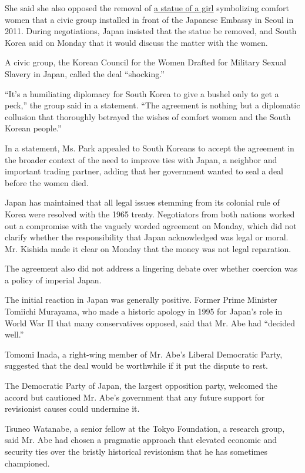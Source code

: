 She said she also opposed the removal of
\href{http://www.nytimes3xbfgragh.onion/2011/12/16/world/asia/statute-in-seoul-becomes-focal-point-of-dispute-between-south-korea-and-japan.html}{a
statue of a girl} symbolizing comfort women that a civic group installed
in front of the Japanese Embassy in Seoul in 2011. During negotiations,
Japan insisted that the statue be removed, and South Korea said on
Monday that it would discuss the matter with the women.

A civic group, the Korean Council for the Women Drafted for Military
Sexual Slavery in Japan, called the deal ``shocking.''

``It's a humiliating diplomacy for South Korea to give a bushel only to
get a peck,'' the group said in a statement. ``The agreement is nothing
but a diplomatic collusion that thoroughly betrayed the wishes of
comfort women and the South Korean people.''

In a statement, Ms. Park appealed to South Koreans to accept the
agreement in the broader context of the need to improve ties with Japan,
a neighbor and important trading partner, adding that her government
wanted to seal a deal before the women died.

Japan has maintained that all legal issues stemming from its colonial
rule of Korea were resolved with the 1965 treaty. Negotiators from both
nations worked out a compromise with the vaguely worded agreement on
Monday, which did not clarify whether the responsibility that Japan
acknowledged was legal or moral. Mr. Kishida made it clear on Monday
that the money was not legal reparation.

The agreement also did not address a lingering debate over whether
coercion was a policy of imperial Japan.

The initial reaction in Japan was generally positive. Former Prime
Minister Tomiichi Murayama, who made a historic apology in 1995 for
Japan's role in World War II that many conservatives opposed, said that
Mr. Abe had ``decided well.''

Tomomi Inada, a right-wing member of Mr. Abe's Liberal Democratic Party,
suggested that the deal would be worthwhile if it put the dispute to
rest.

The Democratic Party of Japan, the largest opposition party, welcomed
the accord but cautioned Mr. Abe's government that any future support
for revisionist causes could undermine it.

Tsuneo Watanabe, a senior fellow at the Tokyo Foundation, a research
group, said Mr. Abe had chosen a pragmatic approach that elevated
economic and security ties over the bristly historical revisionism that
he has sometimes championed.

